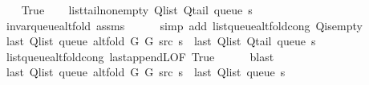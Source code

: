 \begin{isabellebody}
\ \ \isamarkupfalse%
\ True\isanewline
\ \ \isamarkupfalse%
\ list{\isacharunderscore}{\kern0pt}tail{\isacharunderscore}{\kern0pt}non{\isacharunderscore}{\kern0pt}empty{\isacharcolon}{\kern0pt}\ {\isachardoublequoteopen}Q{\isacharunderscore}{\kern0pt}list\ {\isacharparenleft}{\kern0pt}Q{\isacharunderscore}{\kern0pt}tail\ {\isacharparenleft}{\kern0pt}queue\ s{\isacharparenright}{\kern0pt}{\isacharparenright}{\kern0pt}\ {\isasymnoteq}\ {\isacharbrackleft}{\kern0pt}{\isacharbrackright}{\kern0pt}{\isachardoublequoteclose}\isanewline
\ \ \ \ \isamarkupfalse%
\ invar{\isacharunderscore}{\kern0pt}queue{\isacharunderscore}{\kern0pt}alt{\isacharunderscore}{\kern0pt}fold\ assms\isanewline
\ \ \ \ \isamarkupfalse%
\ {\isacharparenleft}{\kern0pt}simp\ add{\isacharcolon}{\kern0pt}\ list{\isacharunderscore}{\kern0pt}queue{\isacharunderscore}{\kern0pt}alt{\isacharunderscore}{\kern0pt}fold{\isacharunderscore}{\kern0pt}cong\ Q{\isachardot}{\kern0pt}is{\isacharunderscore}{\kern0pt}empty{\isacharparenright}{\kern0pt}\isanewline
\isanewline
\ \ \isamarkupfalse%
\ {\isachardoublequoteopen}last\ {\isacharparenleft}{\kern0pt}Q{\isacharunderscore}{\kern0pt}list\ {\isacharparenleft}{\kern0pt}queue\ {\isacharparenleft}{\kern0pt}alt{\isacharunderscore}{\kern0pt}fold\ G{}\ G{}\ src\ s{\isacharparenright}{\kern0pt}{\isacharparenright}{\kern0pt}{\isacharparenright}{\kern0pt}\ {\isacharequal}{\kern0pt}\ last\ {\isacharparenleft}{\kern0pt}Q{\isacharunderscore}{\kern0pt}list\ {\isacharparenleft}{\kern0pt}Q{\isacharunderscore}{\kern0pt}tail\ {\isacharparenleft}{\kern0pt}queue\ s{\isacharparenright}{\kern0pt}{\isacharparenright}{\kern0pt}{\isacharparenright}{\kern0pt}{\isachardoublequoteclose}\isanewline
\ \ \ \ \isamarkupfalse%
\ list{\isacharunderscore}{\kern0pt}queue{\isacharunderscore}{\kern0pt}alt{\isacharunderscore}{\kern0pt}fold{\isacharunderscore}{\kern0pt}cong\ last{\isacharunderscore}{\kern0pt}appendL{\isacharbrackleft}{\kern0pt}OF\ True{\isacharbrackright}{\kern0pt}\isanewline
\ \ \ \ \isamarkupfalse%
\ blast\isanewline
\ \ \isamarkupfalse%
\ {\isachardoublequoteopen}last\ {\isacharparenleft}{\kern0pt}Q{\isacharunderscore}{\kern0pt}list\ {\isacharparenleft}{\kern0pt}queue\ {\isacharparenleft}{\kern0pt}alt{\isacharunderscore}{\kern0pt}fold\ G{}\ G{}\ src\ s{\isacharparenright}{\kern0pt}{\isacharparenright}{\kern0pt}{\isacharparenright}{\kern0pt}\ {\isacharequal}{\kern0pt}\ last\ {\isacharparenleft}{\kern0pt}Q{\isacharunderscore}{\kern0pt}list\ {\isacharparenleft}{\kern0pt}queue\ s{\isacharparenright}{\kern0pt}{\isacharparenright}{\kern0pt}{\isachardoublequoteclose}\isanewline

\end{isabellebody}
